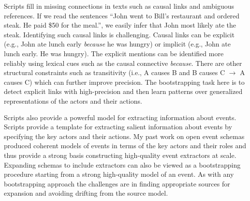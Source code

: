 \documentclass[a4paper,11pt,onecolumn]{article}
\begin{document}
Scripts fill in missing connections in texts such as causal links and ambiguous references. If we read the sentences ``John went to Bill's restaurant and ordered steak. He paid \$50 for the meal.'', we easily infer that John most likely ate the steak. Identifying such causal links is challenging. Causal links can be explicit (e.g., John ate lunch early {\em because} he was hungry) or implicit (e.g., John ate lunch early. He was hungry). The explicit mentions can be identified more reliably using lexical cues such as the causal connective {\em because}. There are other structural constraints such as transitivity (i.e., A causes B and B causes C $\rightarrow$ A causes C) which can further improve precision. The bootstrapping task here is to detect explicit links with high-precision and then learn patterns over generalized representations of the actors and their actions. 



Scripts also provide a powerful model for extracting information about events. Scripts provide a template for extracting salient information about events by specifying the key actors and their actions. My past work on open event schemas produced coherent models of events in terms of the key actors and their roles and thus provide a strong basis constructing high-quality event extractors at scale. Expanding schemas to include extractors can also be viewed as a bootstrapping procedure starting from a strong high-quality model of an event. As with any bootstrapping approach the challenges are in finding appropriate sources for expansion and avoiding drifting from the source model. 
\end{document}
